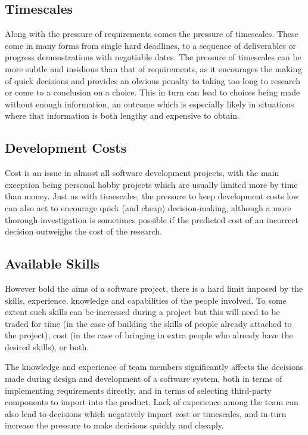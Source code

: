 \subsection{Timescales}
Along with the pressure of requirements comes the pressure of timescales. These come in many forms from single hard deadlines, to a sequence of deliverables or progress demonstrations with negotiable dates. The pressure of timescales can be more subtle and insidious than that of requirements, as it encourages the making of quick decisions and provides an obvious penalty to taking too long to research or come to a conclusion on a choice. This in turn can lead to choices being made without enough information, an outcome which is especially likely in situations where that information is both lengthy and expensive to obtain.

\subsection{Development Costs}
Cost is an issue in almost all software development projects, with the main exception being personal hobby projects which are usually limited more by time than money. Just as with timescales, the pressure to keep development costs low can also act to encourage quick (and cheap) decision-making, although a more thorough investigation is sometimes possible if the predicted cost of an incorrect decision outweighs the cost of the research.

\subsection{Available Skills}
However bold the aims of a software project, there is a hard limit imposed by the skills, experience, knowledge and capabilities of the people involved. To some extent such skills can be increased during a project but this will need to be traded for time (in the case of building the skills of people already attached to the project), cost (in the case of bringing in extra people who already have the desired skills), or both.

The knowledge and experience of team members significantly affects the decisions made during design and development of a software system, both in terms of implementing requirements directly, and in terms of selecting third-party components to import into the product. Lack of experience among the team can also lead to decisions which negatively impact cost or timescales, and in turn increase the pressure to make decisions quickly and cheaply.

